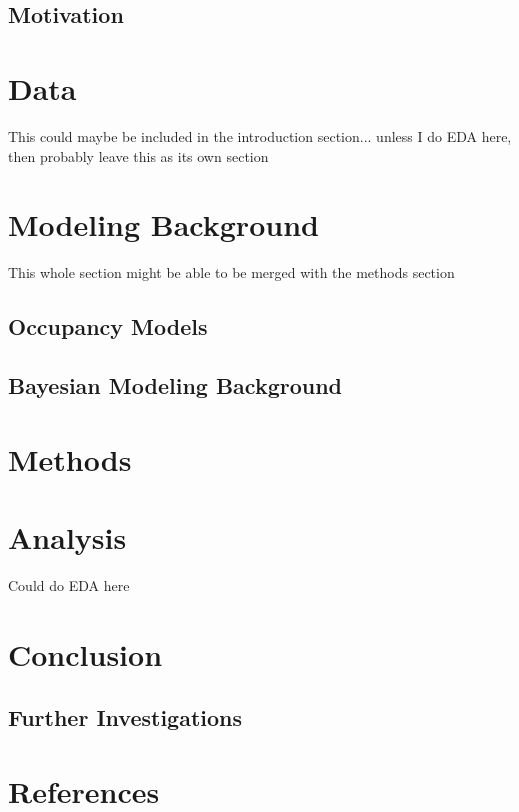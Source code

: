 \documentclass[12pt]{article}\usepackage[]{graphicx}\usepackage[]{color}
\begin{document}
\subsection{Motivation}

\section{Data}

This could maybe be included in the introduction section... unless I do EDA here, then probably leave this as its own section

\section{Modeling Background}

This whole section might be able to be merged with the methods section 

\subsection{Occupancy Models}
 
\subsection{Bayesian Modeling Background}

\section{Methods}


\section{Analysis}

Could do EDA here

\section{Conclusion}

\subsection{Further Investigations}

\newpage
\section{References}
\begingroup
\renewcommand{\section}[2]{}%
\begin{flushleft}

%
%
%
%

\end{flushleft}
\endgroup
\end{document}
